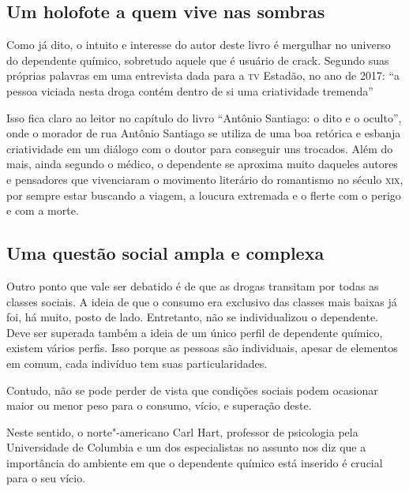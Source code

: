 \documentclass[11pt]{extarticle}
\begin{document}
\subsection{Um holofote a quem vive nas sombras}

Como já dito, o intuito e interesse do autor deste livro é mergulhar no
universo do dependente químico, sobretudo aquele que é usuário de crack.
Segundo suas próprias palavras em uma entrevista dada para a \textsc{tv} Estadão,
no ano de 2017: ``a pessoa viciada nesta droga contém dentro de si uma
criatividade tremenda''


Isso fica claro ao leitor no capítulo do livro ``Antônio Santiago: o
dito e o oculto'', onde o morador de rua Antônio Santiago se utiliza de
uma boa retórica e esbanja criatividade em um diálogo com o doutor para
conseguir uns trocados. Além do mais, ainda segundo o médico, o
dependente se aproxima muito daqueles autores e pensadores que
vivenciaram o movimento literário do romantismo no século \textsc{xix}, por
sempre estar buscando a viagem, a loucura extremada e o flerte com o
perigo e com a morte.

\subsection{Uma questão social ampla e complexa}

Outro ponto que vale ser debatido é de que as drogas transitam por todas
as classes sociais. A ideia de que o consumo era exclusivo das classes
mais baixas já foi, há muito, posto de lado. Entretanto, não se
individualizou o dependente. Deve ser superada também a ideia de um
único perfil de dependente químico, existem vários perfis. Isso porque
as pessoas são individuais, apesar de elementos em comum, cada indivíduo
tem suas particularidades.


Contudo, não se pode perder de vista que condições sociais podem
ocasionar maior ou menor peso para o consumo, vício, e superação deste.

Neste sentido, o norte"-americano Carl Hart, professor de psicologia pela
Universidade de Columbia e um dos especialistas no assunto nos diz que a
importância do ambiente em que o dependente químico está inserido é
crucial para o seu vício.
\end{document}
